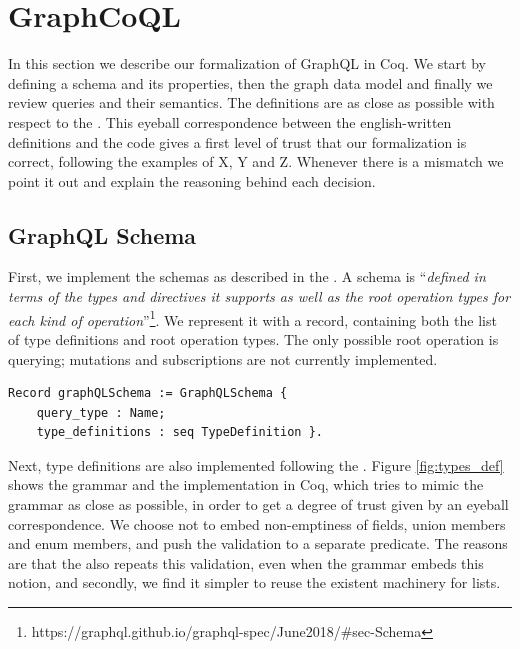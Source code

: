 \section{GraphCoQL}\label{sec:form}

In this section we describe our formalization of GraphQL in Coq. We start by defining a schema and its properties, then the graph data model and finally we review queries and their semantics. The definitions are as close as possible with respect to the \spec{}. This eyeball correspondence between the english-written definitions and the code gives a first level of trust that our formalization is correct, following the examples of X, Y and Z. Whenever there is a mismatch we point it out and explain the reasoning behind each decision.


\subsection{GraphQL Schema}\label{subsec:schema}

First, we implement the schemas as described in the \spec{}.  A schema is ``\textit{defined in terms of the types and directives it supports as well as the root operation types for each kind of operation}''\footnote{https://graphql.github.io/graphql-spec/June2018/\#sec-Schema}. 
We represent it with a record, containing both the list of type definitions and root operation types.  The only possible root operation is querying; mutations and subscriptions are not currently implemented. 

\begin{verbatim}
Record graphQLSchema := GraphQLSchema {
    query_type : Name;
    type_definitions : seq TypeDefinition }.
\end{verbatim}

Next, type definitions are also implemented following the \spec{}. Figure \ref{fig:types_def} shows the grammar and the implementation in Coq, which tries to mimic the grammar as close as possible, in order to get a degree of trust given by an eyeball correspondence. We choose not to embed non-emptiness of fields, union members and enum members, and push the validation to a separate predicate. The reasons are that the \spec{} also repeats this validation, even when the grammar embeds this notion, and secondly, we find it simpler to reuse the existent machinery for lists.

